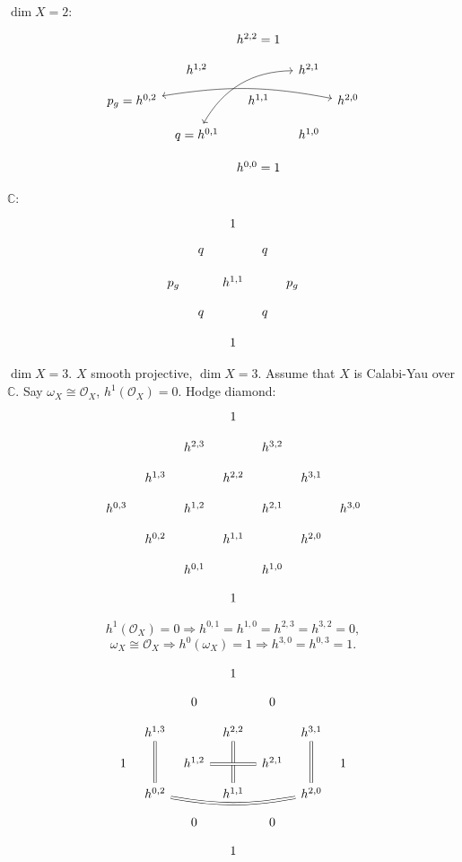 \documentclass[12pt]{article}
\theoremstyle{definition}
\theoremstyle{remark}
\begin{document}
$\dim X=2$:
\[
\begin{tikzcd}[column sep = tiny,row sep = small]
&&h^{2,2}=1\\
&h^{1,2}&&h^{2,1}\\
p_g=h^{0,2}\arrow[<->,rrrr,bend left=10]&&h^{1,1}&&h^{2,0}\\
&q=h^{0,1}\arrow[<->,rruu,bend left]&&h^{1,0}\\
&&h^{0,0}=1
\end{tikzcd}
\]

$\mathbb{C}$:
\[
\begin{tikzcd}[column sep = tiny,row sep = small]
&&1\\
&q&&q\\
p_g&&h^{1,1}&&p_g\\
&q&&q\\
&&1
\end{tikzcd}
\]

$\dim X=3$. $X$ smooth projective, $\dim X=3$. Assume that $X$ is Calabi-Yau over $\mathbb{C}$. Say $\omega_X\cong\mathcal{O}_X$, $h^1(\mathcal{O}_X)=0$. Hodge diamond:
\[
\begin{tikzcd}[column sep = tiny,row sep = small]
&&&1\\
&&h^{2,3}&&h^{3,2}\\
&h^{1,3}&&h^{2,2}&&h^{3,1}\\
h^{0,3}&&h^{1,2}&&h^{2,1}&&h^{3,0}\\
&h^{0,2}&&h^{1,1}&&h^{2,0}\\
&&h^{0,1}&&h^{1,0}\\
&&&1
\end{tikzcd}
\]

\[h^1(\mathcal{O}_X)=0\Rightarrow h^{0,1}=h^{1,0}=h^{2,3}=h^{3,2}=0,\]
\[\omega_X\cong\mathcal{O}_X\Rightarrow h^0(\omega_X)=1\Rightarrow h^{3,0}=h^{0,3}=1.\]

\[
\begin{tikzcd}[column sep = tiny,row sep = small]
&&&1\\
&&0&&0\\
&h^{1,3}\arrow[dd,-,double equal sign distance,double]&&h^{2,2}\arrow[dd,-,double equal sign distance,double]&&h^{3,1}\arrow[dd,-,double equal sign distance,double]\\
1&&h^{1,2}\arrow[rr,-,double equal sign distance,double]&&h^{2,1}&&1\\
&h^{0,2}\arrow[rrrr,-,double equal sign distance,double,bend right=10]&&h^{1,1}&&h^{2,0}\\
&&0&&0\\
&&&1
\end{tikzcd}
\]
\end{document}
